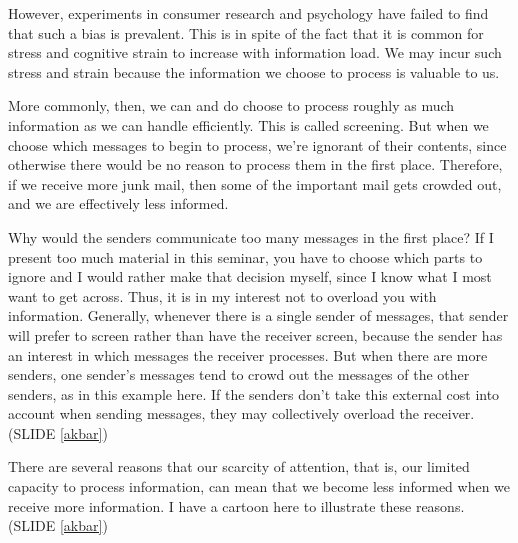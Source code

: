 \documentclass[ignorenonframetext]{beamer}
\newcommand{\sref}[1]{SLIDE \ref{#1}}
\begin{document}
However, experiments in consumer research and psychology have failed to find
that such a bias is prevalent. This is in spite of the fact that it is common
for stress and cognitive strain to increase with information load. We may
incur such stress and strain because the information we choose to process is
valuable to us.

More commonly, then, we can and do choose to process roughly as much
information as we can handle efficiently. This is called screening. But when
we choose which messages to begin to process, we're ignorant of their
contents, since otherwise there would be no reason to process them in the
first place. Therefore, if we receive more junk mail, then some of the
important mail gets crowded out, and we are effectively less informed.


{}

  Why would the senders communicate too many messages in the first place? If I
present too much material in this seminar, you have to choose which parts to
ignore and I would rather make that decision myself, since I know what I most
want to get across. Thus, it is in my interest not to overload you with
information. Generally, whenever there is a single sender of messages, that
sender will prefer to screen rather than have the receiver screen, because the
sender has an interest in which messages the receiver processes.
But when there are more senders, one sender's  messages tend to crowd out the
messages of the other senders, as in this example here. If the senders don't
take this external cost into account when sending messages, they may
collectively overload the receiver. (\sref{akbar})

There are several reasons that our scarcity of attention, that is, our limited
capacity to process information, can mean that we become less informed when we
receive  more information. I have a cartoon here to illustrate these reasons.
(\sref{akbar})
\end{document}
